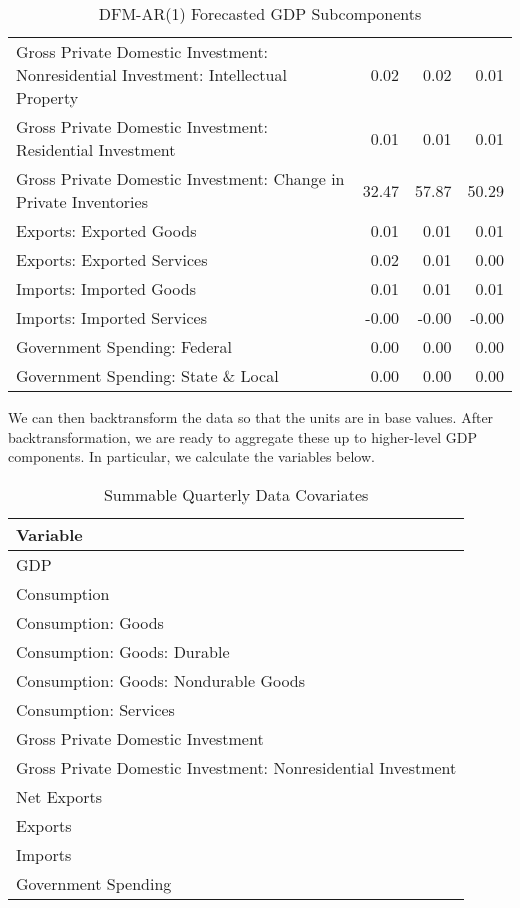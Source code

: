 \documentclass[11pt, letterpaper]{article}\usepackage[]{graphicx}\usepackage[]{color}
\begin{document}
\begin{table}[H]
\begin{tabular}{lrrr}
  Gross Private Domestic Investment: Nonresidential Investment: Intellectual Property & 0.02 & 0.02 & 0.01 \\ 
  Gross Private Domestic Investment: Residential Investment & 0.01 & 0.01 & 0.01 \\ 
  Gross Private Domestic Investment: Change in Private Inventories & 32.47 & 57.87 & 50.29 \\ 
  Exports: Exported Goods & 0.01 & 0.01 & 0.01 \\ 
  Exports: Exported Services & 0.02 & 0.01 & 0.00 \\ 
  Imports: Imported Goods & 0.01 & 0.01 & 0.01 \\ 
  Imports: Imported Services & -0.00 & -0.00 & -0.00 \\ 
  Government Spending: Federal & 0.00 & 0.00 & 0.00 \\ 
  Government Spending: State \& Local & 0.00 & 0.00 & 0.00 \\ 
   \hline
\end{tabular}
\endgroup
\caption{DFM-AR(1) Forecasted GDP Subcomponents} 
\end{table}


We can then backtransform the data so that the units are in base values. After backtransformation, we are ready to aggregate these up to higher-level GDP components. In particular, we calculate the variables below.
\begin{table}[H]
\centering
\begingroup\scriptsize
\begin{tabular}{l}
  \hline
Variable \\ 
  \hline
GDP \\ 
  Consumption \\ 
  Consumption: Goods \\ 
  Consumption: Goods: Durable \\ 
  Consumption: Goods: Nondurable Goods \\ 
  Consumption: Services \\ 
  Gross Private Domestic Investment \\ 
  Gross Private Domestic Investment: Nonresidential Investment \\ 
  Net Exports \\ 
  Exports \\ 
  Imports \\ 
  Government Spending \\ 
   \hline
\end{tabular}
\endgroup
\caption{Summable Quarterly Data Covariates} 
\end{table}
\end{document}
